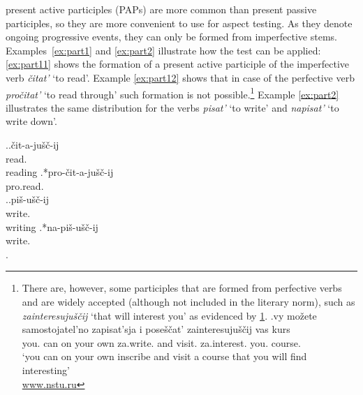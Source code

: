present active participles   (PAPs) are more common than present passive participles, so they are more convenient to use for aspect testing. As they denote ongoing progressive events, they can only be formed from imperfective stems. Examples~\ref{ex:part1} and \ref{ex:part2} illustrate how the test can be applied: \ref{ex:part11} shows the formation of a present active participle  of the imperfective verb  \textit{\v{c}itat'} `to read'. Example \ref{ex:part12} shows that in case of the perfective verb  \textit{pro\v{c}itat'} `to read through' such formation is not possible.\footnote{There are, however, some participles that are formed from perfective verbs  and are widely accepted (although not included in the literary norm), such as \textit{zainteresuju\v{s}\v{c}ij} `that will interest you' as evidenced by \ref{ex:PFP}.
\exg.\label{ex:PFP}vy mo\v{z}ete samostojatel'no zapisat'sja i pose\v{s}\v{c}at' zainteresuju\v{s}\v{c}ij vas kurs\\
you. can {on your own} za.write. and visit. za.interest. you. course.\\
\trans `you can on your own inscribe and visit a course that you will find interesting'\\\hbox{} \hfill \hbox{\url{www.nstu.ru}}

} Example \ref{ex:part2} illustrates the same distribution for the verbs \textit{pisat'}\textsuperscript{\IPF} `to write' and \textit{napisat'}\textsuperscript{\PF} `to write down'.

\ex.\label{ex:part1}\ag.\label{ex:part11}\v{c}it-a-ju\v{s}\v{c}-ij\\
read\textsuperscript{\IPF}.\\
reading
\bg.\label{ex:part12}*pro-\v{c}it-a-ju\v{s}\v{c}-ij\\
pro.read\textsuperscript{\PF}.\\

\ex.\label{ex:part2}\ag.\label{ex:part21}pi\v{s}-u\v{s}\v{c}-ij\\
write\textsuperscript{\IPF}.\\
writing
\bg.\label{ex:part22}*na-pi\v{s}-u\v{s}\v{c}-ij\\
write\textsuperscript{\PF}.\\
\z.


